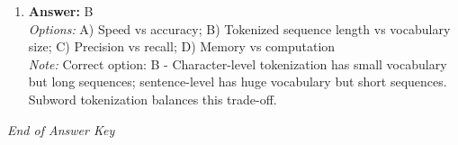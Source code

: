 \documentclass[12pt]{article}
\begin{document}
\begin{enumerate}[label=Q\arabic*.]
\\ \textit{Options:} A) It cannot represent overlapping or nested entities; B) It requires too many labels; C) It does not support multiple entity types; D) It ignores entity boundaries
\\ \textit{Note:} Correct option: A - BIO tagging assigns exactly one label per token, making it impossible to represent nested or overlapping entities (e.g., "New York University" containing both "New York" and the full name).
\item \textbf{Answer:} B
\\ \textit{Options:} A) Speed vs accuracy; B) Tokenized sequence length vs vocabulary size; C) Precision vs recall; D) Memory vs computation
\\ \textit{Note:} Correct option: B - Character-level tokenization has small vocabulary but long sequences; sentence-level has huge vocabulary but short sequences. Subword tokenization balances this trade-off.
\end{enumerate}

\vfill
\noindent\textit{End of Answer Key}
\end{document}

